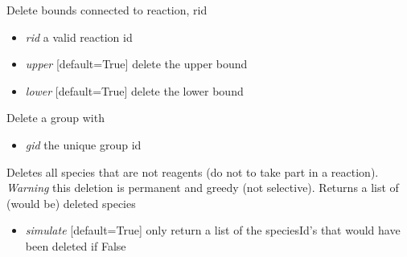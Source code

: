 \documentclass[a4paper,11pt,english]{sphinxmanual}
\begin{document}
\begin{fulllineitems}
\begin{fulllineitems}
\begin{itemize}
\end{itemize}

\end{fulllineitems}


\begin{fulllineitems}
\label{modules_doc:cbmpy.CBModel.Model.deleteBoundsForReactionId}
Delete bounds connected to reaction, rid
\begin{itemize}
\item {} 
\emph{rid} a valid reaction id

\item {} 
\emph{upper} {[}default=True{]} delete the upper bound

\item {} 
\emph{lower} {[}default=True{]} delete the lower bound

\end{itemize}

\end{fulllineitems}


\begin{fulllineitems}
\label{modules_doc:cbmpy.CBModel.Model.deleteGroup}
Delete a group with
\begin{itemize}
\item {} 
\emph{gid} the unique group id

\end{itemize}

\end{fulllineitems}


\begin{fulllineitems}
\label{modules_doc:cbmpy.CBModel.Model.deleteNonReactingSpecies}
Deletes all species that are not reagents (do not to take part in a reaction).
\emph{Warning} this deletion is permanent and greedy (not selective). Returns a list of (would be) deleted species
\begin{itemize}
\item {} 
\emph{simulate} {[}default=True{]} only return a list of the speciesId's that would have been deleted if False


\end{itemize}
\end{fulllineitems}
\end{fulllineitems}
\end{document}
